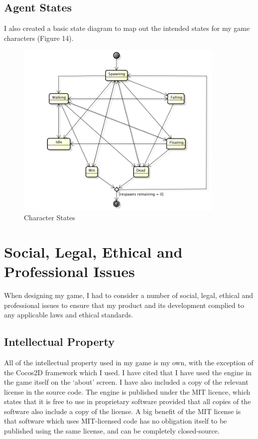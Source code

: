 \documentclass[a4paper,oneside]{report}
\begin{document}
\section{Agent States}

I also created a basic state diagram to map out the intended states for my game characters (Figure 14).

\begin{figure}[h!]
  \centering
    \includegraphics[width=100mm]{sources/images/LemmingStatemachine}
    \caption{Character States}
\end{figure}
	
	
\chapter{Social, Legal, Ethical and Professional Issues}

When designing my game, I had to consider a number of social, legal, ethical and professional issues to ensure that my product and its development complied to any applicable laws and ethical standards.

\section{Intellectual Property}

All of the intellectual property used in my game is my own, with the exception of the Cocos2D framework which I used. I have cited that I have used the engine in the game itself on the `about' screen. I have also included a copy of the relevant license in the source code. The engine is published under the MIT licence, which states that it is free to use in proprietary software provided that all copies of the software also include a copy of the license. A big benefit of the MIT license is that software which uses MIT-licensed code has no obligation itself to be published using the same license, and can be completely closed-source.
\end{document}
